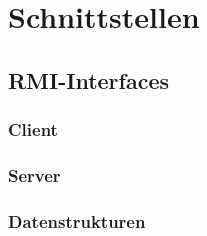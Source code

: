\section{Schnittstellen} 

\subsection{RMI-Interfaces}

\subsubsection{Client}





\subsubsection{Server}




\subsubsection{Datenstrukturen}









